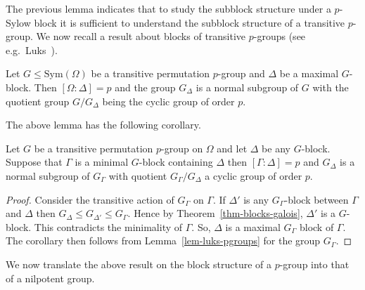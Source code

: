 \documentclass[prodmod,acmtalg]{acmsmall}
\newcommand{\Sym}[1]{{\ensuremath{\mathrm{Sym}\left(#1\right)}}}
\begin{document}
The previous lemma indicates that to study the subblock structure
under a $p$-Sylow block it is sufficient to understand the subblock
structure of a transitive $p$-group.  We now recall a result about
blocks of transitive $p$-groups (see e.g.\ Luks~\cite[Lemma
1.1]{luks82bounded}).

\begin{lemma}\label{lem-luks-pgroups}
  Let $G\leq\Sym{\Omega}$ be a transitive permutation $p$-group and
  $\Delta$ be a maximal $G$-block.  Then $[\Omega : \Delta]=p$ and the
  group $G_\Delta$ is a normal subgroup of $G$ with the quotient group
  $G/G_\Delta$ being the cyclic group of order $p$.
\end{lemma}

The above lemma has the following corollary.

\begin{corollary}\label{cor-luks-pgroups}
  Let $G$ be a transitive permutation $p$-group on $\Omega$ and let
  $\Delta$ be any $G$-block. Suppose that $\Gamma$ is a minimal
  $G$-block containing $\Delta$ then $[\Gamma : \Delta] = p$ and
  $G_\Delta$ is a normal subgroup of $G_\Gamma$ with quotient
  $G_\Gamma/G_\Delta$ a cyclic group of order $p$.
\end{corollary}
\begin{proof}
  Consider the transitive action of $G_\Gamma$ on $\Gamma$. If
  $\Delta'$ is any $G_\Gamma$-block between $\Gamma$ and $\Delta$ then
  $G_\Delta \leq G_{\Delta'} \leq G_\Gamma$. Hence by
  Theorem~\ref{thm-blocks-galois}, $\Delta'$ is a $G$-block.  This
  contradicts the minimality of $\Gamma$. So, $\Delta$ is a maximal
  $G_\Gamma$ block of $\Gamma$. The corollary then follows from
  Lemma~\ref{lem-luks-pgroups} for the group $G_\Gamma$.
\end{proof}

We now translate the above result on the block structure of a
$p$-group into that of a nilpotent group.
\end{document}
